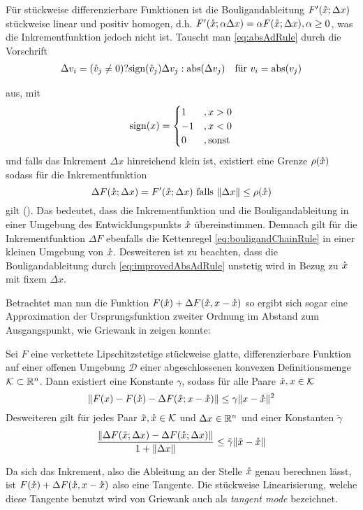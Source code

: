 Für stückweise differenzierbare Funktionen ist die Bouligandableitung $F'(\mathring{x};\Delta x)$ stückweise linear und positiv homogen, d.h. $F'(\mathring{x};\alpha \Delta x) = \alpha F(\mathring{x};\Delta x), \alpha\geq 0$, was die Inkrementfunktion jedoch nicht ist.
Tauscht man \eqref{eq:absAdRule} durch die Vorschrift
\begin{equation}
 \label{eq:improvedAbsAdRule}
 \begin{aligned}
  \Delta v_i &= (\mathring{v}_j \neq 0)?\text{sign}(\mathring{v}_j)\Delta v_j:\operatorname{abs}(\Delta v_j) &\text{für } v_i = \operatorname{abs}(v_j)
 \end{aligned}
\end{equation}

aus, mit
\[
 \sign(x) = \begin{cases}
            1 &, x>0\\
            -1&, x<0\\
            0 &, \text{sonst}
           \end{cases}

\]
und falls das Inkrement $\Delta x$ hinreichend klein ist, existiert eine Grenze $\rho(\mathring{x})$ sodass für die Inkrementfunktion 
 \[
  \Delta F(\mathring{x};\Delta x) = F'(\mathring{x};\Delta x)\text{ falls }\|\Delta x\|\leq \rho(\mathring{x})
 \]
gilt  (\cite[S.10 ff]{monster}). Das bedeutet, dass die Inkrementfunktion und die Bouligandableitung in einer Umgebung des Entwicklungspunkts $\mathring{x}$ übereinstimmen. Demnach gilt für die Inkrementfunktion $\Delta F$ ebenfalls die Kettenregel \eqref{eq:bouligandChainRule} in einer kleinen Umgebung von $\mathring{x}$. Desweiteren ist zu beachten, dass die Bouligandableitung durch \eqref{eq:improvedAbsAdRule} unstetig wird in Bezug zu $\mathring{x}$ mit fixem $\Delta x$. 

Betrachtet man nun die Funktion $F(\mathring{x})+\Delta F(\mathring{x}, x-\mathring{x})$ so ergibt sich sogar eine Approximation der Ursprungsfunktion zweiter Ordnung im Abstand zum Ausgangspunkt, wie Griewank in \cite[Prop.1]{monster} zeigen konnte:

\begin{theorem}
\label{thm:quadrApproxPL}
 Sei $F$ eine verkettete Lipschitzstetige stückweise glatte, differenzierbare Funktion auf einer offenen Umgebung $\mathcal D$ einer abgeschlossenen konvexen Definitionsmenge $\mathcal K \subset \mathbb{R}^n$. Dann existiert eine Konstante $\gamma$, sodass für alle Paare $\mathring{x},x\in \mathcal K$
 \[
  \|F(x) - F(\mathring{x}) - \Delta F(\mathring{x};x-\mathring{x})\| \leq \gamma \|x-\mathring{x}\|^2
 \]
 Desweiteren gilt für jedes Paar $\tilde x,\mathring{x}\in \mathcal K$ und $\Delta x\in \mathbb{R}^n$ und einer Konstanten $\tilde\gamma$
 \[
  \frac{\|\Delta F(\tilde x;\Delta x) - \Delta F(\mathring{x};\Delta x)\|}{1+\|\Delta x\|}\leq \tilde \gamma \|\tilde x - \mathring{x}\|
 \]
\end{theorem}
Da sich das Inkrement, also die Ableitung an der Stelle $\mathring{x}$ genau berechnen lässt, ist $F(\mathring{x})+\Delta F(\mathring{x}, x-\mathring{x})$ also eine Tangente. Die stückweise Linearisierung, welche diese Tangente benutzt wird von Griewank auch als \textit{tangent mode} bezeichnet. 

